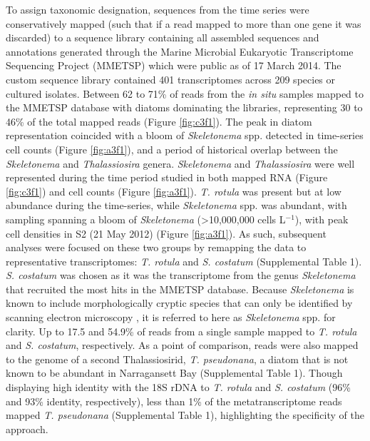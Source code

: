 To assign taxonomic designation, sequences from the time series were conservatively mapped (such that if a read mapped to more than one gene it was discarded) to a sequence library containing all assembled sequences and annotations generated through the Marine Microbial Eukaryotic Transcriptome Sequencing Project (MMETSP) \citep{Keeling2014} which were public as of 17 March 2014. The custom sequence library contained 401 transcriptomes across 209 species or cultured isolates. Between 62 to 71\% of reads from the \textit{in situ} samples mapped to the MMETSP database with diatoms dominating the libraries, representing 30 to 46\% of the total mapped reads (Figure \ref{fig:c3f1}). The peak in diatom representation coincided with a bloom of \textit{Skeletonema} spp. detected in time-series cell counts (Figure \ref{fig:a3f1}), and a period of historical overlap between the \textit{Skeletonema} and \textit{Thalassiosira} genera. \textit{Skeletonema} and \textit{Thalassiosira} were well represented during the time period studied in both mapped RNA (Figure \ref{fig:c3f1}) and cell counts (Figure \ref{fig:a3f1}). \textit{T. rotula} was present but at low abundance during the time-series, while \textit{Skeletonema} spp. was abundant, with sampling spanning a bloom of \textit{Skeletonema} (>10,000,000 cells L$^{-1}$), with peak cell densities in S2 (21 May 2012) (Figure \ref{fig:a3f1}). As such, subsequent analyses were focused on these two groups by remapping the data to representative transcriptomes: \textit{T. rotula} and \textit{S. costatum} (Supplemental Table 1). \textit{S. costatum} was chosen as it was the transcriptome from the genus \textit{Skeletonema} that recruited the most hits in the MMETSP database. Because \textit{Skeletonema} is known to include morphologically cryptic species that can only be identified by scanning electron microscopy \citep{Sarno2005, Zingone2005, Smayda2011}, it is referred to here as \textit{Skeletonema} spp. for clarity. Up to 17.5 and 54.9\% of reads from a single sample mapped to \textit{T. rotula} and \textit{S. costatum}, respectively. As a point of comparison, reads were also mapped to the genome of a second Thalassiosirid, \textit{T. pseudonana}, a diatom that is not known to be abundant in Narragansett Bay (Supplemental Table 1). Though displaying high identity with the 18S rDNA to \textit{T. rotula} and \textit{S. costatum} (96\% and 93\% identity, respectively), less than 1\% of the metatranscriptome reads mapped \textit{T. pseudonana} (Supplemental Table 1), highlighting the specificity of the approach. 

